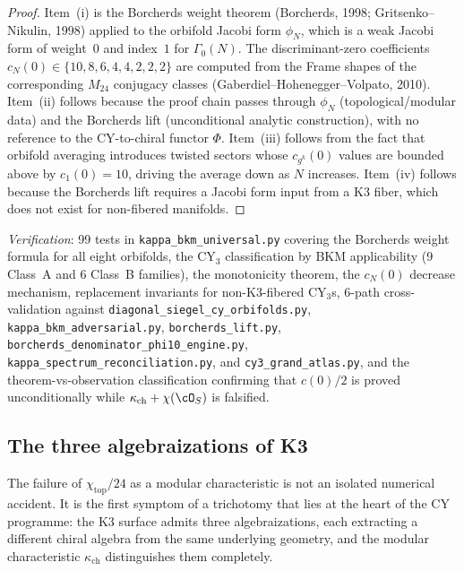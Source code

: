 \begin{proof}
Item~(i) is the Borcherds weight theorem \textup{(}Borcherds, 1998; Gritsenko--Nikulin, 1998\textup{)} applied to the orbifold Jacobi form $\phi_N$, which is a weak Jacobi form of weight~$0$ and index~$1$ for $\Gamma_0(N)$.  The discriminant-zero coefficients $c_N(0) \in \{10, 8, 6, 4, 4, 2, 2, 2\}$ are computed from the Frame shapes of the corresponding $M_{24}$ conjugacy classes \textup{(}Gaberdiel--Hohenegger--Volpato, 2010\textup{)}.  Item~(ii) follows because the proof chain passes through $\phi_N$ \textup{(}topological/modular data\textup{)} and the Borcherds lift \textup{(}unconditional analytic construction\textup{)}, with no reference to the CY-to-chiral functor $\Phi$.  Item~(iii) follows from the fact that orbifold averaging introduces twisted sectors whose $c_{g^k}(0)$ values are bounded above by $c_1(0) = 10$, driving the average down as $N$ increases.  Item~(iv) follows because the Borcherds lift requires a Jacobi form input from a K3 fiber, which does not exist for non-fibered manifolds.
\end{proof}

\noindent\textit{Verification}: 99 tests in \texttt{kappa\_bkm\_universal.py} covering the Borcherds weight formula for all eight orbifolds, the CY$_3$ classification by BKM applicability (9 Class~A and 6 Class~B families), the monotonicity theorem, the $c_N(0)$ decrease mechanism, replacement invariants for non-K3-fibered CY$_3$s, 6-path cross-validation against \texttt{diagonal\_siegel\_cy\_orbifolds.py}, \texttt{kappa\_bkm\_adversarial.py}, \texttt{borcherds\_lift.py}, \texttt{borcherds\_denominator\_phi10\_engine.py}, \texttt{kappa\_spectrum\_reconciliation.py}, and \texttt{cy3\_grand\_atlas.py}, and the theorem-vs-observation classification confirming that $c(0)/2$ is proved unconditionally while $\kappa_{\mathrm{ch}} + \chi(\cO_S)$ is falsified.

\subsection{The three algebraizations of K3}
\label{subsec:k3-three-algebraizations}


The failure of $\chi_{\mathrm{top}}/24$ as a modular characteristic is not an isolated
numerical accident. It is the first symptom of a trichotomy that lies at the heart
of the CY programme: the K3 surface admits three algebraizations, each extracting
a different chiral algebra from the same underlying geometry, and the modular
characteristic $\kappa_{\mathrm{ch}}$ distinguishes them completely.


